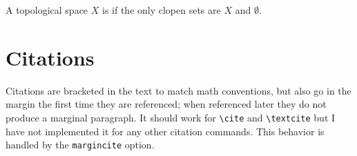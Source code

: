 \documentclass{sl2ams}
\begin{document}
\begin{definition}
  A topological space \(X\) is  if the only clopen sets are \(X\) and \(\emptyset\).
\end{definition}



\section{Citations}
Citations are bracketed in the text \cite{Graham1994} to match math conventions, but also go in the margin the first time they are referenced; when referenced later \cite{Graham1994} they do not produce a marginal paragraph.
It should work for \texttt{\textbackslash{}cite} and \texttt{\textbackslash{}textcite} but I have not implemented it for any other citation commands.
This behavior is handled by the \texttt{margincite} option.


\printbibliography
  
\end{document}

